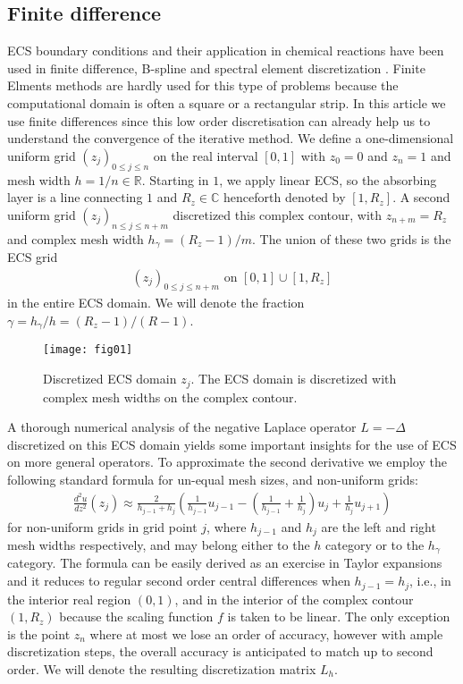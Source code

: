 \documentclass[mathpazo]{cicp}
\theoremstyle{definition}
\numberwithin{equation}{section}
\providecommand{\wv}{}
\providecommand{\hbz}{}
\providecommand{\edt}{}
\begin{document}
\subsection{Finite difference }
ECS boundary conditions and their application in chemical reactions
have been used in finite difference, B-spline and spectral element
discretization \cite{mccurdyTR2004}. \wv{Finite Elments methods are
  hardly used for this type of problems because the computational
  domain is often a square or a rectangular strip.} In this article we
use finite differences \wv{since this low order discretisation can
  already help us to understand the convergence of the iterative
  method.} We define a one-dimensional uniform grid $(z_j)_{0\leq
  j\leq n}$ on the real interval $[0,1]$ with $z_0 = 0$ and $z_n=1$
and mesh width $h = 1/n \in\mathbb{R}$. Starting in $1$, we apply
linear ECS, so the absorbing layer is a line connecting $1$ and
$R_z\in\mathbb{C}$ henceforth denoted by $[1,R_z]$. A second uniform
grid $(z_j)_{n\leq j\leq n+m}$ discretized this complex contour, with
$z_{n+m} = R_z$ and complex mesh width $h_\gamma = (R_z-1)/m$. The
union of these two grids is the ECS grid
\begin{align}\label{eq:ecsgrid}
(z_j)_{0\leq j\leq n+m} \mbox{ on } [0,1]\cup[1,R_z]
\end{align}
in the entire ECS domain. We will denote the fraction $\gamma = h_\gamma/h = (R_z-1)/(R-1)$.
\begin{figure}[htbp!]
\begin{center}
\texttt{[image: fig01]}\caption{Discretized ECS domain $z_j$. The ECS domain is discretized with complex mesh widths on the complex contour.}\label{fig:disecs}
\end{center}
\end{figure}

A thorough numerical analysis of the negative Laplace operator $L=-\Delta$ discretized on this ECS domain yields some important insights for the use of ECS on more general operators. To approximate the second derivative we \hbz{employ the following standard formula for un-equal mesh sizes, and non-uniform grids:}
\begin{align*}
\frac{d^2u}{d z^2}(z_j) \approx
\frac{2}{h_{j-1}+h_j}\left(\frac{1}{h_{j-1}}u_{j-1}-\left(\frac{1}{h_{j-1}}+\frac{1}{h_j}\right)u_j
+\frac{1}{h_j}u_{j+1}\right)
\end{align*}
for non-uniform grids in grid point $j$, where $h_{j-1}$ and $h_j$ are the left and right mesh widths respectively, and may belong either to the $h$ category or to the $h_\gamma$ category. \wv{The formula can be easily derived as \edt{an} exercise in Taylor expansions} and it reduces to regular second order central differences when $h_{j-1}=h_j$, i.e., in the interior real region $(0,1)$, and in the interior of the complex contour $(1,R_z)$ because the scaling function $f$ is taken to be linear. The only exception is the point $z_n$ where at most we lose an order of accuracy, however with ample discretization steps, the overall accuracy is anticipated to match up to second order. We will denote the resulting discretization matrix $L_h$.
\end{document}
